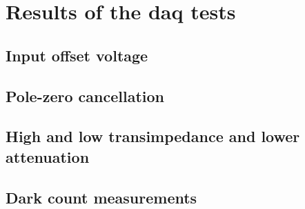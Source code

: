 \chapter{Results of the \ac{daq} tests}


\section{Input offset voltage}
\section{Pole-zero cancellation}
\section{High and low transimpedance and lower attenuation}
\section{Dark count measurements}

